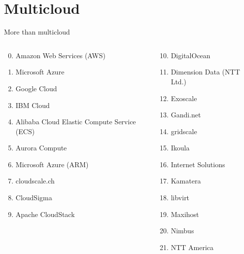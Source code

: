 \documentclass[aspectratio=169]{beamer}
\begin{document}
\section{Multicloud}

\begin{frame}{More than multicloud}
    \begin{columns}
        \begin{column}{0.3\textwidth}
           \begin{enumerate}[<+->]
                \setcounter{enumi}{-1}
                \item Amazon Web Services (AWS)
                \item Microsoft Azure
                \item Google Cloud
                \item IBM Cloud
                \item Alibaba Cloud Elastic Compute Service (ECS)
                \item Aurora Compute
                \item Microsoft Azure (ARM)
                \item cloudscale.ch
                \item CloudSigma
                \item Apache CloudStack
           \end{enumerate}
        \end{column}
        \begin{column}{0.3\textwidth}  %
            \begin{enumerate}[<+->]
                \setcounter{enumi}{9}
                \item DigitalOcean
                \item Dimension Data (NTT Ltd.)
                \item Exoscale
                \item Gandi.net
                \item gridscale
                \item Ikoula
                \item Internet Solutions
                \item Kamatera
                \item libvirt
                \item Maxihost
                \item Nimbus
                \item NTT America
            \end{enumerate}

\end{column}
\end{columns}
\end{frame}
\end{document}
